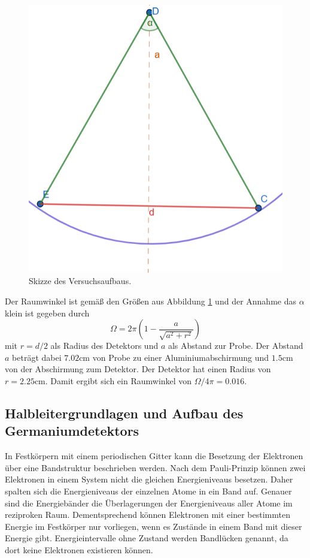 \begin{figure}[H]
    \centering
    \includegraphics[scale=0.6]{illustration/Raumwinkel.png}
    \caption{Skizze des Versuchsaufbaus.}
    \label{fig:Raumwinkel}
\end{figure}
\noindent Der Raumwinkel ist gemäß den Größen aus Abbildung \ref{fig:Raumwinkel} und der Annahme das $\alpha$ klein ist gegeben durch
\begin{equation}
    \label{eq:Raumwinkel}
    \Omega = 2\pi\left(1-\frac{a}{\sqrt{a^2+r^2}}\right)
\end{equation}
mit $r=d/2$ als Radius des Detektors und $a$ als Abstand zur Probe. Der Abstand $a$ beträgt dabei $7.02\si{\centi\meter}$ von Probe zu einer Aluminiumabschirmung
und $1.5\si{\centi\meter}$ von der Abschirmung zum Detektor. Der Detektor hat einen Radius von $r=2.25\si{\centi\meter}$.
Damit ergibt sich ein Raumwinkel von $\Omega/4\pi=0.016$.
\subsection{Halbleitergrundlagen und Aufbau des Germaniumdetektors}

In Festkörpern mit einem periodischen Gitter kann die Besetzung der Elektronen über eine Bandstruktur beschrieben werden.
Nach dem Pauli-Prinzip können zwei Elektronen in einem System nicht die gleichen Energieniveaus besetzen. Daher spalten sich 
die Energieniveaus der einzelnen Atome in ein Band auf. Genauer sind die Energiebänder die Überlagerungen der Energieniveaus aller Atome im 
reziproken Raum. Dementsprechend können Elektronen mit einer bestimmten Energie im Festkörper nur vorliegen, wenn es Zustände in einem Band mit dieser 
Energie gibt. Energieintervalle ohne Zustand werden Bandlücken genannt, da dort keine Elektronen existieren können.

